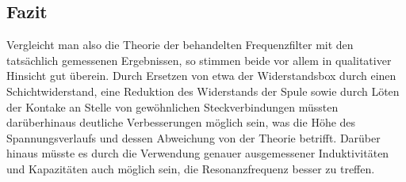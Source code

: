 \subsection{Fazit}
Vergleicht man also die Theorie der behandelten Frequenzfilter mit den tatsächlich gemessenen Ergebnissen, so stimmen beide vor allem in qualitativer Hinsicht gut überein. Durch Ersetzen von etwa der Widerstandsbox durch einen Schichtwiderstand, eine Reduktion des Widerstands der Spule sowie durch Löten der Kontake an Stelle von gewöhnlichen Steckverbindungen müssten darüberhinaus deutliche Verbesserungen möglich sein, was die Höhe des Spannungsverlaufs und dessen Abweichung von der Theorie betrifft. 
Darüber hinaus müsste es durch die Verwendung genauer ausgemessener Induktivitäten und Kapazitäten auch möglich sein, die Resonanzfrequenz besser zu treffen. 
